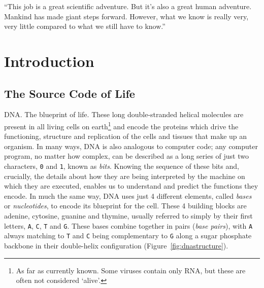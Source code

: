 \begin{savequote}[75mm]
``This job is a great scientific adventure. But it's also a great human adventure. Mankind has made giant steps forward. However, what we know is really very, very little compared to what we still have to know.''
\end{savequote}


\chapter{Introduction}\label{introduction}
\setcounter{figure}{-1}
\setcounter{table}{-1}
\setcounter{section}{-1}
\setcounter{NAT@ctr}{-1}

\setlength\parindent{0pt}

\begin{justify}

\section{The Source Code of Life}

DNA\@. The blueprint of life. These long double-stranded helical molecules are present in all living cells on earth\footnote{As far as currently known. Some viruses contain only RNA, but these are often not considered `alive'.} and encode the proteins which drive the functioning, structure and replication of the cells and tissues that make up an organism. In many ways, DNA is also analogous to computer code; any computer program, no matter how complex, can be described as a long series of just two characters, \verb+0+ and \verb+1+, known as \emph{bits}. Knowing the sequence of these bits and, crucially, the details about how they are being interpreted by the machine on which they are executed, enables us to understand and predict the functions they encode. In much the same way, DNA uses just 4 different elements, called \emph{bases} or \emph{nucleotides}, to encode its blueprint for the cell. These 4 building blocks are adenine, cytosine, guanine and thymine, usually referred to simply by their first letters, \verb+A+, \verb+C+, \verb+T+ and \verb+G+. These bases combine together in pairs (\emph{base pairs}), with \verb+A+ always matching to \verb+T+ and \verb+C+ being complementary to \verb+G+ along a sugar phosphate backbone in their double-helix configuration (Figure~\ref{fig:dnastructure}).

\end{justify}



